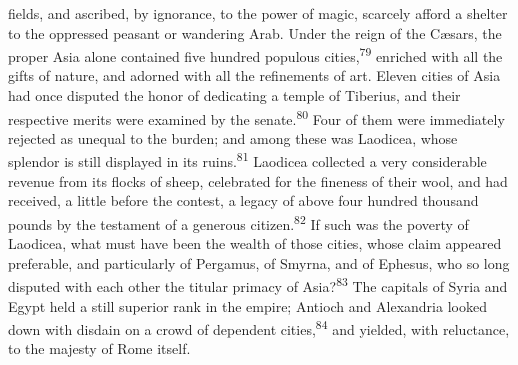 fields, and ascribed, by ignorance, to the power of magic,
scarcely afford a shelter to the oppressed peasant or wandering
Arab. Under the reign of the Cæsars, the proper Asia alone
contained five hundred populous cities,\textsuperscript{79} enriched with all the
gifts of nature, and adorned with all the refinements of art.
Eleven cities of Asia had once disputed the honor of dedicating a
temple of Tiberius, and their respective merits were examined by
the senate.\textsuperscript{80} Four of them were immediately rejected as unequal
to the burden; and among these was Laodicea, whose splendor is
still displayed in its ruins.\textsuperscript{81} Laodicea collected a very
considerable revenue from its flocks of sheep, celebrated for the
fineness of their wool, and had received, a little before the
contest, a legacy of above four hundred thousand pounds by the
testament of a generous citizen.\textsuperscript{82} If such was the poverty of
Laodicea, what must have been the wealth of those cities, whose
claim appeared preferable, and particularly of Pergamus, of
Smyrna, and of Ephesus, who so long disputed with each other the
titular primacy of Asia?\textsuperscript{83} The capitals of Syria and Egypt held
a still superior rank in the empire; Antioch and Alexandria
looked down with disdain on a crowd of dependent cities,\textsuperscript{84} and
yielded, with reluctance, to the majesty of Rome itself.




